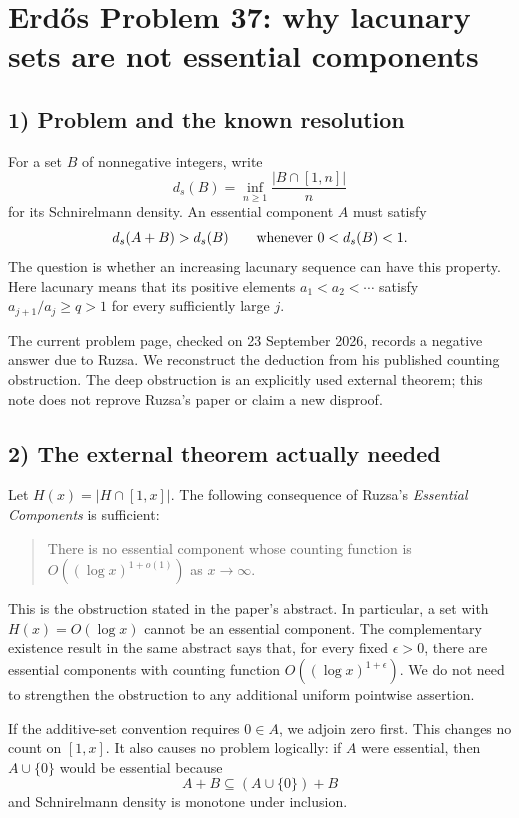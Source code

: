 \section{Erd\H{o}s Problem 37: why lacunary sets are not essential components}

\subsection{1) Problem and the known resolution}
For a set $B$ of nonnegative integers, write
\[
 d_s(B)=\inf_{n\geq1}\frac{|B\cap[1,n]|}{n}
\]
for its Schnirelmann density. An essential component $A$ must satisfy
\[
 d_s(A+B)>d_s(B)\qquad\hbox{whenever }0<d_s(B)<1.
\]
The question is whether an increasing lacunary sequence can have this
property. Here lacunary means that its positive elements
$a_1<a_2<\cdots$ satisfy $a_{j+1}/a_j\geq q>1$ for every sufficiently
large $j$.

The current problem page, checked on 23 September 2026, records a
negative answer due to Ruzsa. We reconstruct the deduction from his
published counting obstruction. The deep obstruction is an explicitly
used external theorem; this note does not reprove Ruzsa's paper or
claim a new disproof.

\subsection{2) The external theorem actually needed}
Let $H(x)=|H\cap[1,x]|$. The following consequence of Ruzsa's
\emph{Essential Components} is sufficient:
\begin{quote}
There is no essential component whose counting function is
$O((\log x)^{1+o(1)})$ as $x\to\infty$.
\end{quote}
This is the obstruction stated in the paper's abstract. In particular,
a set with $H(x)=O(\log x)$ cannot be an essential component.
The complementary existence result in the same abstract says that,
for every fixed $\epsilon>0$, there are essential components with
counting function $O((\log x)^{1+\epsilon})$.
We do not need to strengthen the obstruction to any additional uniform
pointwise assertion.

If the additive-set convention requires $0\in A$, we adjoin zero first.
This changes no count on $[1,x]$. It also causes no problem logically:
if $A$ were essential, then $A\cup\{0\}$ would be essential because
\[
 A+B\subseteq(A\cup\{0\})+B
\]
and Schnirelmann density is monotone under inclusion.

